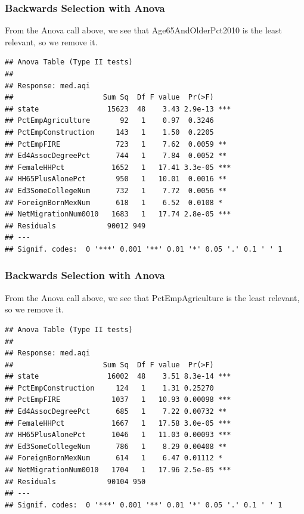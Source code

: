 \documentclass[
  ignorenonframetext,
]{beamer}
\begin{document}
\begin{frame}[fragile]
\frametitle{Backwards Selection with Anova}

From the Anova call above, we see that Age65AndOlderPct2010 is the least
relevant, so we remove it.

\tiny

\begin{verbatim}
## Anova Table (Type II tests)
## 
## Response: med.aqi
##                     Sum Sq  Df F value  Pr(>F)    
## state                15623  48    3.43 2.9e-13 ***
## PctEmpAgriculture       92   1    0.97  0.3246    
## PctEmpConstruction     143   1    1.50  0.2205    
## PctEmpFIRE             723   1    7.62  0.0059 ** 
## Ed4AssocDegreePct      744   1    7.84  0.0052 ** 
## FemaleHHPct           1652   1   17.41 3.3e-05 ***
## HH65PlusAlonePct       950   1   10.01  0.0016 ** 
## Ed3SomeCollegeNum      732   1    7.72  0.0056 ** 
## ForeignBornMexNum      618   1    6.52  0.0108 *  
## NetMigrationNum0010   1683   1   17.74 2.8e-05 ***
## Residuals            90012 949                    
## ---
## Signif. codes:  0 '***' 0.001 '**' 0.01 '*' 0.05 '.' 0.1 ' ' 1
\end{verbatim}
\end{frame}

\begin{frame}[fragile]
\frametitle{Backwards Selection with Anova}

From the Anova call above, we see that PctEmpAgriculture is the least
relevant, so we remove it.

\tiny

\begin{verbatim}
## Anova Table (Type II tests)
## 
## Response: med.aqi
##                     Sum Sq  Df F value  Pr(>F)    
## state                16002  48    3.51 8.3e-14 ***
## PctEmpConstruction     124   1    1.31 0.25270    
## PctEmpFIRE            1037   1   10.93 0.00098 ***
## Ed4AssocDegreePct      685   1    7.22 0.00732 ** 
## FemaleHHPct           1667   1   17.58 3.0e-05 ***
## HH65PlusAlonePct      1046   1   11.03 0.00093 ***
## Ed3SomeCollegeNum      786   1    8.29 0.00408 ** 
## ForeignBornMexNum      614   1    6.47 0.01112 *  
## NetMigrationNum0010   1704   1   17.96 2.5e-05 ***
## Residuals            90104 950                    
## ---
## Signif. codes:  0 '***' 0.001 '**' 0.01 '*' 0.05 '.' 0.1 ' ' 1
\end{verbatim}
\end{frame}
\end{document}
